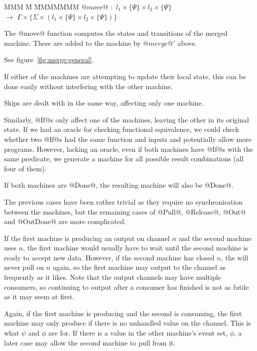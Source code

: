 \begin{tabbing}
MMM \= M \= MMMMMMM\kill
$@move@$ \> $:$ \> $l_1 \times \{\Psi\} \times l_2 \times \{\Psi\}$ \\
           \> $\to$ \> $\Gamma \times \{\Sigma \times (l_1 \times \{\Psi\} \times l_2 \times \{\Psi\})\}$ \\
\end{tabbing}

The @move@ function computes the states and transitions of the merged machine.
These are added to the machine by $@merge@'$ above.

See figure~\ref{fig:merge:general}.



If either of the machines are attempting to update their local state, this can be done easily without interfering with the other machine.

Skips are dealt with in the same way, affecting only one machine.

Similarly, @If@s only affect one of the machines, leaving the other in its original state.
If we had an oracle for checking functional equivalence, we could check whether two @If@s had the same function and inputs and potentially allow more programs.
However, lacking an oracle, even if both machines have @If@s with the same predicate, we generate a machine for all possible result combinations (all four of them).

If both machines are @Done@, the resulting machine will also be @Done@.

The previous cases have been rather trivial as they require no synchronisation between the machines, but the remaining cases of @Pull@, @Release@, @Out@ and @OutDone@ are more complicated.

If the first machine is producing an output on channel $n$ and the second machine uses $n$, the first machine would usually have to wait until the second machine is ready to accept new data.
However, if the second machine has closed $n$, the will never pull on $n$ again, so the first machine may output to the channel as frequently as it likes.
Note that the output channels may have multiple consumers, so continuing to output after a consumer has finished is not as futile as it may seem at first.

Again, if the first machine is producing and the second is consuming, the first machine may only produce if there is no unhandled value on the channel.
This is what $\psi$ and $\phi$ are for.
If there is a value in the other machine's event set, $\phi$, a later case may allow the second machine to pull from it.

